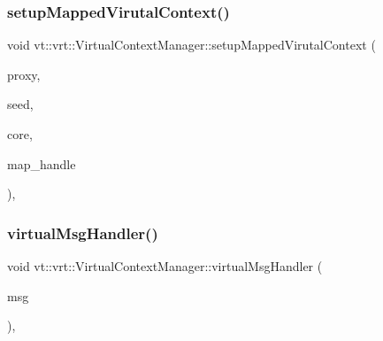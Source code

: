 \subsubsection{\texorpdfstring{setup\+Mapped\+Virutal\+Context()}{setupMappedVirutalContext()}}
{\footnotesize\ttfamily void vt\+::vrt\+::\+Virtual\+Context\+Manager\+::setup\+Mapped\+Virutal\+Context (\begin{DoxyParamCaption}\item[{\hyperlink{namespacevt_a1b417dd5d684f045bb58a0ede70045ac}{Virtual\+Proxy\+Type} const \&}]{proxy,  }\item[{\hyperlink{namespacevt_ae2e13198bdef4d5b8e603d6c1c7f0969}{Seed\+Type} const \&}]{seed,  }\item[{\hyperlink{namespacevt_a74b11b22c02feaabab8591acc87c7c52}{Core\+Type} const \&}]{core,  }\item[{\hyperlink{namespacevt_af64846b57dfcaf104da3ef6967917573}{Handler\+Type} const}]{map\+\_\+handle }\end{DoxyParamCaption})\hspace{0.3cm}{\ttfamily [inline]}, {\ttfamily [private]}}

\mbox{\label{structvt_1_1vrt_1_1_virtual_context_manager_abb1cc10ecf9f53a7f9486cf69446ee81}} 
\subsubsection{\texorpdfstring{virtual\+Msg\+Handler()}{virtualMsgHandler()}}
{\footnotesize\ttfamily void vt\+::vrt\+::\+Virtual\+Context\+Manager\+::virtual\+Msg\+Handler (\begin{DoxyParamCaption}\item[{\hyperlink{namespacevt_ac34f95a5e2b8109b55bfba52b074443d}{Base\+Message} $\ast$}]{msg }\end{DoxyParamCaption})\hspace{0.3cm}{\ttfamily [static]}, {\ttfamily [private]}}

\mbox{\label{structvt_1_1vrt_1_1_virtual_context_manager_a62719655b49a47446040710712da6419}} 
